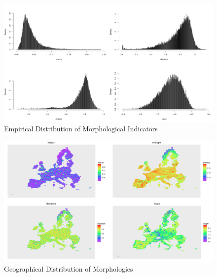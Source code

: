 \begin{figure}
\includegraphics[width=1.2\textwidth]{Figures/PartII/Empirical/Static/Density/hists_GOOD}
\caption[Empirical Distribution of Morphological Indicators]{Empirical Distribution of Morphological Indicators}
\end{figure}

\begin{figure}
\hspace{-5cm}
\includegraphics[angle=90,width=1.7\textwidth,height=\textheight]{Figures/PartII/Empirical/Static/Density/all_50km}
\caption[Geographical Distribution of Morphologies]{Geographical Distribution of Morphologies}
\end{figure}


